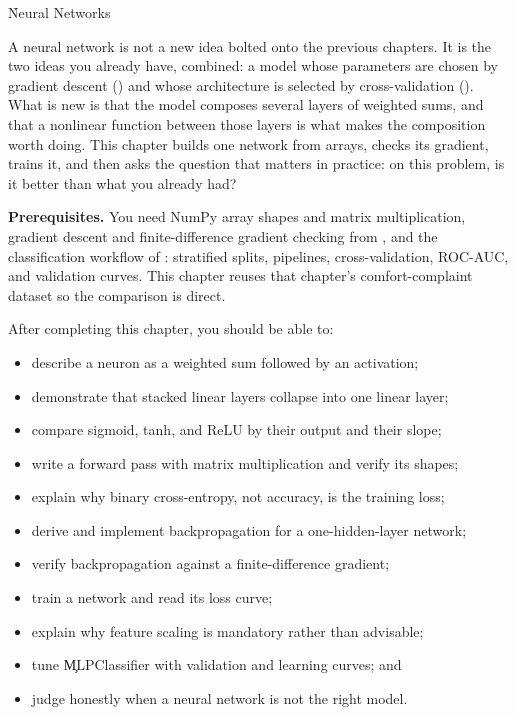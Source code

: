
\h{Neural Networks}
\label{ch:22}

A neural network is not a new idea bolted onto the previous chapters. It is the
two ideas you already have, combined: a model whose parameters are chosen by
gradient descent () and whose architecture is
selected by cross-validation (). What is new is that
the model composes several layers of weighted sums, and that a nonlinear
function between those layers is what makes the composition worth doing. This
chapter builds one network from arrays, checks its gradient, trains it, and then
asks the question that matters in practice: on this problem, is it better than
what you already had?

\begin{NoteBox}
\textbf{Prerequisites.} You need NumPy array shapes and matrix multiplication,
gradient descent and finite-difference gradient checking from
, and the classification workflow of
: stratified splits, pipelines, cross-validation,
ROC-AUC, and validation curves. This chapter reuses that chapter's
comfort-complaint dataset so the comparison is direct.
\end{NoteBox}

\begin{tcolorbox}[title=Learning outcomes,colframe=orange,colback=white,arc=2mm]
After completing this chapter, you should be able to:
\begin{itemize}
    \item describe a neuron as a weighted sum followed by an activation;
    \item demonstrate that stacked linear layers collapse into one linear layer;
    \item compare sigmoid, tanh, and ReLU by their output and their slope;
    \item write a forward pass with matrix multiplication and verify its shapes;
    \item explain why binary cross-entropy, not accuracy, is the training loss;
    \item derive and implement backpropagation for a one-hidden-layer network;
    \item verify backpropagation against a finite-difference gradient;
    \item train a network and read its loss curve;
    \item explain why feature scaling is mandatory rather than advisable;
    \item tune \c{MLPClassifier} with validation and learning curves; and
    \item judge honestly when a neural network is not the right model.
\end{itemize}
\end{tcolorbox}

